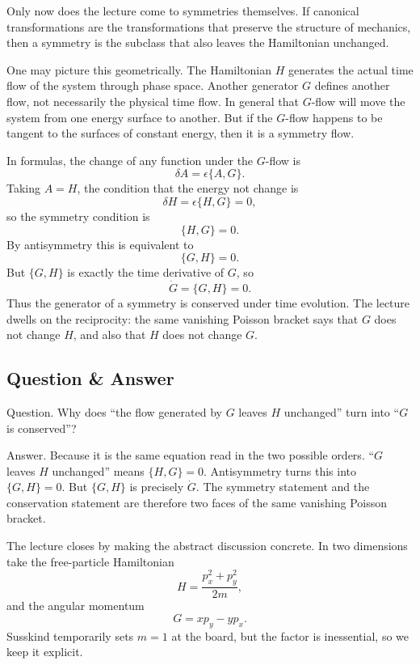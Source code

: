 Only now does the lecture come to symmetries themselves. If canonical transformations are the transformations that preserve the structure of mechanics, then a symmetry is the subclass that also leaves the Hamiltonian unchanged.

One may picture this geometrically. The Hamiltonian \(H\) generates the actual time flow of the system through phase space. Another generator \(G\) defines another flow, not necessarily the physical time flow. In general that \(G\)-flow will move the system from one energy surface to another. But if the \(G\)-flow happens to be tangent to the surfaces of constant energy, then it is a symmetry flow.

In formulas, the change of any function under the \(G\)-flow is
\[
\delta A=\epsilon\{A,G\}.
\]
Taking \(A=H\), the condition that the energy not change is
\begin{equation}
\delta H=\epsilon\{H,G\}=0,
\end{equation}
so the symmetry condition is
\begin{equation}
\{H,G\}=0.
\end{equation}
By antisymmetry this is equivalent to
\begin{equation}
\{G,H\}=0.
\end{equation}
But \(\{G,H\}\) is exactly the time derivative of \(G\), so
\begin{equation}
\dot G=\{G,H\}=0.
\end{equation}
Thus the generator of a symmetry is conserved under time evolution. The lecture dwells on the reciprocity: the same vanishing Poisson bracket says that \(G\) does not change \(H\), and also that \(H\) does not change \(G\).

\subsection{Question \& Answer}

Question. Why does ``the flow generated by \(G\) leaves \(H\) unchanged'' turn into ``\(G\) is conserved''?

Answer. Because it is the same equation read in the two possible orders. ``\(G\) leaves \(H\) unchanged'' means \(\{H,G\}=0\). Antisymmetry turns this into \(\{G,H\}=0\). But \(\{G,H\}\) is precisely \(\dot G\). The symmetry statement and the conservation statement are therefore two faces of the same vanishing Poisson bracket.

The lecture closes by making the abstract discussion concrete. In two dimensions take the free-particle Hamiltonian
\begin{equation}
H=\frac{p_x^2+p_y^2}{2m},
\end{equation}
and the angular momentum
\begin{equation}
G=xp_y-yp_x.
\end{equation}
Susskind temporarily sets \(m=1\) at the board, but the factor is inessential, so we keep it explicit.


